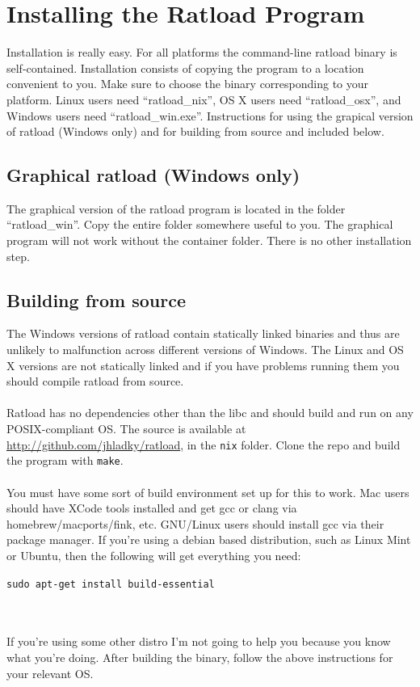 \documentclass[notitlepage]{article}
\begin{document}
\section{Installing the Ratload Program}
Installation is really easy. For all platforms the command-line ratload binary is self-contained. Installation consists of copying the program to a location convenient to you. Make sure to choose the binary corresponding to your platform. Linux users need ``ratload\_nix'', OS X users need ``ratload\_osx'', and Windows users need ``ratload\_win.exe''. Instructions for using the grapical version of ratload (Windows only) and for building from source and included below.

\subsection{Graphical ratload (Windows only)}
The graphical version of the ratload program is located in the folder ``ratload\_win''. Copy the entire folder somewhere useful to you. The graphical program will not work without the container folder. There is no other installation step.

\subsection{Building from source}
\label{sec:source_build}
The Windows versions of ratload contain statically linked binaries and thus are unlikely to malfunction across different versions of Windows. The Linux and OS X versions are not statically linked and if you have problems running them you should compile ratload from source.\\\\
Ratload has no dependencies other than the libc and should build and run on any POSIX-compliant OS. The source is available at \url{http://github.com/jhladky/ratload}, in the \texttt{nix} folder. Clone the repo and build the program with \texttt{make}.\\\\
You must have some sort of build environment set up for this to work. Mac users should have XCode tools installed and get gcc or clang via homebrew/macports/fink, etc. GNU/Linux users should install gcc via their package manager. If you're using a debian based distribution, such as Linux Mint or Ubuntu, then the following will get everything you need:\\
\centerline{\texttt{sudo apt-get install build-essential}}\\\\
If you're using some other distro I'm not going to help you because you know what you're doing. After building the binary, follow the above instructions for your relevant OS.
\end{document}
